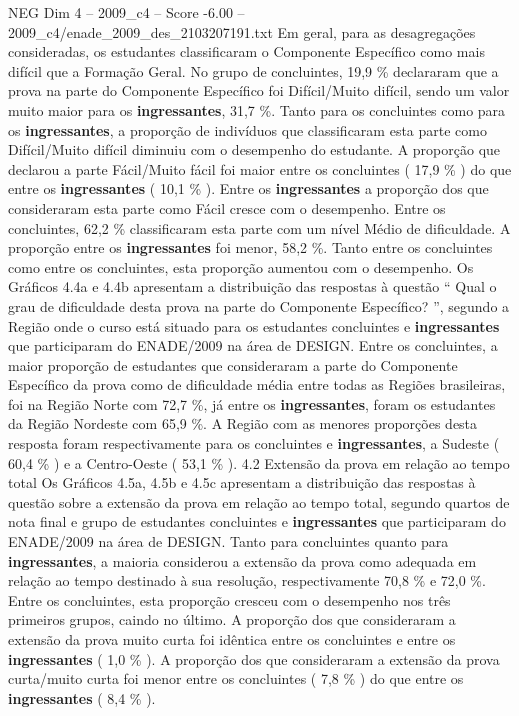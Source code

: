 \begin{textsample}{NEG Dim 4 – 2009\_c4 – Score -6.00 – 2009\_c4/enade\_2009\_des\_2103207191.txt}
Em geral, para as desagregações consideradas, os estudantes classificaram o Componente Específico como mais difícil que a Formação Geral.
No grupo de concluintes, 19,9 \% declararam que a prova na parte do Componente Específico foi Difícil/Muito difícil, sendo um valor muito maior para os \textbf{ingressantes}, 31,7 \%.
Tanto para os concluintes como para os \textbf{ingressantes}, a proporção de indivíduos que classificaram esta parte como Difícil/Muito difícil diminuiu com o desempenho do estudante.
A proporção que declarou a parte Fácil/Muito fácil foi maior entre os concluintes ( 17,9 \% ) do que entre os \textbf{ingressantes} ( 10,1 \% ).
Entre os \textbf{ingressantes} a proporção dos que consideraram esta parte como Fácil cresce com o desempenho.
Entre os concluintes, 62,2 \% classificaram esta parte com um nível Médio de dificuldade.
A proporção entre os \textbf{ingressantes} foi menor, 58,2 \%.
Tanto entre os concluintes como entre os concluintes, esta proporção aumentou com o desempenho.
Os Gráficos 4.4a e 4.4b apresentam a distribuição das respostas à questão “ Qual o grau de dificuldade desta prova na parte do Componente Específico? ”, segundo a Região onde o curso está situado para os estudantes concluintes e \textbf{ingressantes} que participaram do ENADE/2009 na área de DESIGN.
Entre os concluintes, a maior proporção de estudantes que consideraram a parte do Componente Específico da prova como de dificuldade média entre todas as Regiões brasileiras, foi na Região Norte com 72,7 \%, já entre os \textbf{ingressantes}, foram os estudantes da Região Nordeste com 65,9 \%.
A Região com as menores proporções desta resposta foram respectivamente para os concluintes e \textbf{ingressantes}, a Sudeste ( 60,4 \% ) e a Centro-Oeste ( 53,1 \% ). 4.2 Extensão da prova em relação ao tempo total Os Gráficos 4.5a, 4.5b e 4.5c apresentam a distribuição das respostas à questão sobre a extensão da prova em relação ao tempo total, segundo quartos de nota final e grupo de estudantes concluintes e \textbf{ingressantes} que participaram do ENADE/2009 na área de DESIGN.
Tanto para concluintes quanto para \textbf{ingressantes}, a maioria considerou a extensão da prova como adequada em relação ao tempo destinado à sua resolução, respectivamente 70,8 \% e 72,0 \%.
Entre os concluintes, esta proporção cresceu com o desempenho nos três primeiros grupos, caindo no último.
A proporção dos que consideraram a extensão da prova muito curta foi idêntica entre os concluintes e entre os \textbf{ingressantes} ( 1,0 \% ).
A proporção dos que consideraram a extensão da prova curta/muito curta foi menor entre os concluintes ( 7,8 \% ) do que entre os \textbf{ingressantes} ( 8,4 \% ).

\end{textsample}
